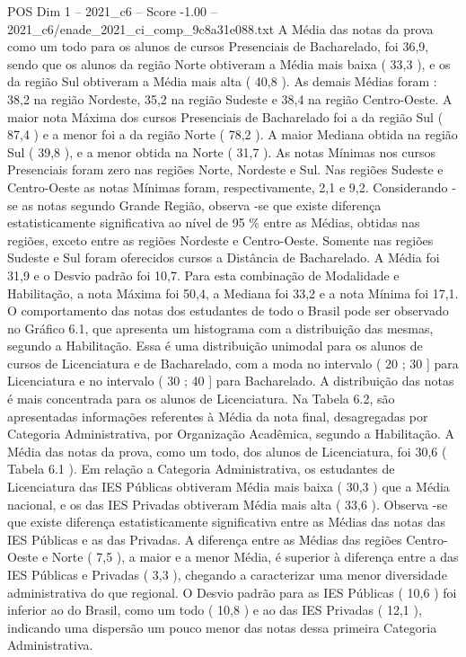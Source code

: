 \begin{textsample}{POS Dim 1 – 2021\_c6 – Score -1.00 – 2021\_c6/enade\_2021\_ci\_comp\_9c8a31e088.txt}
A Média das notas da prova como um todo para os alunos de cursos Presenciais de Bacharelado, foi 36,9, sendo que os alunos da região Norte obtiveram a Média mais baixa ( 33,3 ), e os da região Sul obtiveram a Média mais alta ( 40,8 ).
As demais Médias foram : 38,2 na região Nordeste, 35,2 na região Sudeste e 38,4 na região Centro-Oeste.
A maior nota Máxima dos cursos Presenciais de Bacharelado foi a da região Sul ( 87,4 ) e a menor foi a da região Norte ( 78,2 ).
A maior Mediana obtida na região Sul ( 39,8 ), e a menor obtida na Norte ( 31,7 ).
As notas Mínimas nos cursos Presenciais foram zero nas regiões Norte, Nordeste e Sul.
Nas regiões Sudeste e Centro-Oeste as notas Mínimas foram, respectivamente, 2,1 e 9,2.
Considerando -se as notas segundo Grande Região, observa -se que existe diferença estatisticamente significativa ao nível de 95 \% entre as Médias, obtidas nas regiões, exceto entre as regiões Nordeste e Centro-Oeste.
Somente nas regiões Sudeste e Sul foram oferecidos cursos a Distância de Bacharelado.
A Média foi 31,9 e o Desvio padrão foi 10,7.
Para esta combinação de Modalidade e Habilitação, a nota Máxima foi 50,4, a Mediana foi 33,2 e a nota Mínima foi 17,1.
O comportamento das notas dos estudantes de todo o Brasil pode ser observado no Gráfico 6.1, que apresenta um histograma com a distribuição das mesmas, segundo a Habilitação.
Essa é uma distribuição unimodal para os alunos de cursos de Licenciatura e de Bacharelado, com a moda no intervalo ( 20 ; 30 ] para Licenciatura e no intervalo ( 30 ; 40 ] para Bacharelado.
A distribuição das notas é mais concentrada para os alunos de Licenciatura.
Na Tabela 6.2, são apresentadas informações referentes à Média da nota final, desagregadas por Categoria Administrativa, por Organização Acadêmica, segundo a Habilitação.
A Média das notas da prova, como um todo, dos alunos de Licenciatura, foi 30,6 ( Tabela 6.1 ).
Em relação a Categoria Administrativa, os estudantes de Licenciatura das IES Públicas obtiveram Média mais baixa ( 30,3 ) que a Média nacional, e os das IES Privadas obtiveram Média mais alta ( 33,6 ).
Observa -se que existe diferença estatisticamente significativa entre as Médias das notas das IES Públicas e as das Privadas.
A diferença entre as Médias das regiões Centro-Oeste e Norte ( 7,5 ), a maior e a menor Média, é superior à diferença entre a das IES Públicas e Privadas ( 3,3 ), chegando a caracterizar uma menor diversidade administrativa do que regional.
O Desvio padrão para as IES Públicas ( 10,6 ) foi inferior ao do Brasil, como um todo ( 10,8 ) e ao das IES Privadas ( 12,1 ), indicando uma dispersão um pouco menor das notas dessa primeira Categoria Administrativa.

\end{textsample}
